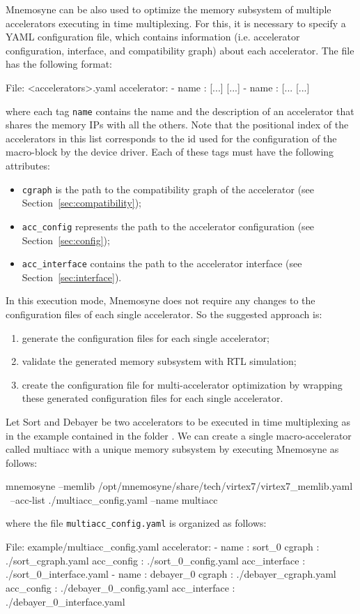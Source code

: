 {\sc Mnemosyne} can be also used to optimize the memory subsystem of multiple
accelerators executing in time multiplexing. For this, it is necessary to
specify a YAML configuration file, which contains information (i.e. accelerator
configuration, interface, and compatibility graph) about each accelerator.
The file has the following format:
\begin{myxml}{File: <accelerators>.yaml}
accelerator:
  - name          : [...]
    [...]
  - name          : [...
    [...]
\end{myxml}
\noindent where each tag {\tt name} contains the name and the description of an
accelerator that shares the memory IPs with all the others. Note that the
positional index of the accelerators in this list corresponds to the id used for
the configuration of the macro-block by the device driver.
Each of these tags must have the following attributes:
\begin{itemize}
\item {\tt cgraph} is the path to the compatibility graph of the accelerator
(see Section~\ref{sec:compatibility});
\item {\tt acc\_config} represents the path to the accelerator configuration
(see Section~\ref{sec:config});
\item {\tt acc\_interface} contains the path to the accelerator interface (see
Section~\ref{sec:interface}).
\end{itemize}
\noindent In this execution mode, {\sc Mnemosyne} does not require any changes to the configuration files of each single accelerator. So the suggested approach is:
\begin{enumerate}
\item generate the configuration files for each single accelerator;
\item validate the generated memory subsystem with RTL simulation;
\item create the configuration file for multi-accelerator optimization by wrapping 
these generated configuration files for each single accelerator.
\end{enumerate}
\noindent Let {\sc Sort} and {\sc Debayer} be two accelerators to be executed in
time multiplexing as in the example contained in the folder . We can create a single macro-accelerator called {\sc multiacc}
with a unique memory subsystem by executing {\sc Mnemosyne} as follows:
\begin{commandshell}{}
  mnemosyne --memlib /opt/mnemosyne/share/tech/virtex7/virtex7_memlib.yaml  \                 --acc-list ./multiacc_config.yaml --name multiacc
\end{commandshell}
\noindent where the file {\tt multiacc\_config.yaml} is organized as follows:
\begin{myxml}{File: example/multiacc\_config.yaml}
accelerator:
  - name          : sort_0
    cgraph        : ./sort_cgraph.yaml
    acc_config    : ./sort_0_config.yaml
    acc_interface : ./sort_0_interface.yaml
  - name          : debayer_0
    cgraph        : ./debayer_cgraph.yaml
    acc_config    : ./debayer_0_config.yaml
    acc_interface : ./debayer_0_interface.yaml
\end{myxml}

